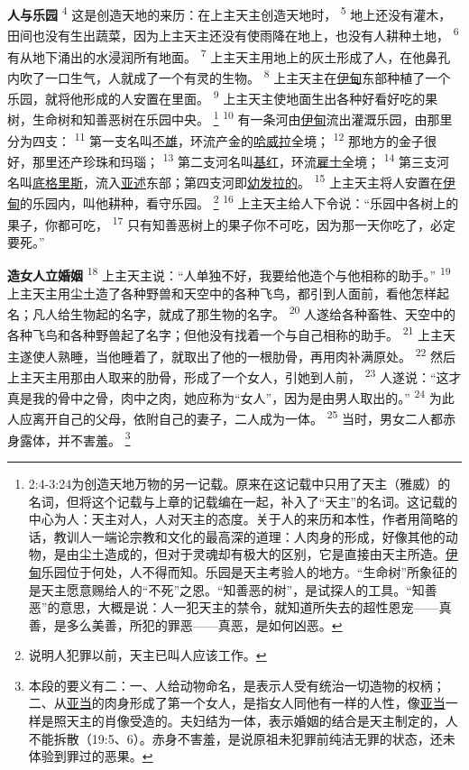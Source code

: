 \textbf{人与乐园 }
\textsuperscript{4}
这是创造天地的来历：在上主天主创造天地时，
\textsuperscript{5}
地上还没有灌木，田间也没有生出蔬菜，因为上主天主还没有使雨降在地上，也没有人耕种土地，
\textsuperscript{6}
有从地下涌出的水浸润所有地面。
\textsuperscript{7}
上主天主用地上的灰土形成了人，在他鼻孔内吹了一口生气，人就成了一个有灵的生物。
\textsuperscript{8}
上主天主在\uline{伊甸}东部种植了一个乐园，就将他形成的人安置在里面。
\textsuperscript{9}
上主天主使地面生出各种好看好吃的果树，生命树和知善恶树在乐园中央。
\footnote{2:4-3:24为创造天地万物的另一记载。原来在这记载中只用了天主（雅威）的名词，但将这个记载与上章的记载编在一起，补入了“天主”的名词。这记载的中心为人：天主对人，人对天主的态度。关于人的来历和本性，作者用简略的话，教训人一端论宗教和文化的最高深的道理：人肉身的形成，好像其他的动物，是由尘土造成的，但对于灵魂却有极大的区别，它是直接由天主所造。\uline{伊甸}乐园位于何处，人不得而知。乐园是天主考验人的地方。“生命树”所象征的是天主愿意赐给人的“不死”之恩。“知善恶的树”，是试探人的工具。“知善恶”的意思，大概是说：人一犯天主的禁令，就知道所失去的超性恩宠——真善，是多么美善，所犯的罪恶——真恶，是如何凶恶。}
\textsuperscript{10}
有一条河由\uline{伊甸}流出灌溉乐园，由那里分为四支：
\textsuperscript{11}
第一支名叫\uline{丕雄}，环流产金的\uline{哈威拉}全境；
\textsuperscript{12}
那地方的金子很好，那里还产珍珠和玛瑙；
\textsuperscript{13}
第二支河名叫\uline{基红}，环流\uline{雇士}全境；
\textsuperscript{14}
第三支河名叫\uline{底格里斯}，流入\uline{亚述}东部；第四支河即\uline{幼发拉的}。
\textsuperscript{15}
上主天主将人安置在\uline{伊甸}的乐园内，叫他耕种，看守乐园。
\footnote{说明人犯罪以前，天主已叫人应该工作。}
\textsuperscript{16}
上主天主给人下令说：“乐园中各树上的果子，你都可吃，
\textsuperscript{17}
只有知善恶树上的果子你不可吃，因为那一天你吃了，必定要死。”

\textbf{造女人立婚姻 }
\textsuperscript{18}
上主天主说：“人单独不好，我要给他造个与他相称的助手。”
\textsuperscript{19}
上主天主用尘土造了各种野兽和天空中的各种飞鸟，都引到人面前，看他怎样起名；凡人给生物起的名字，就成了那生物的名字。
\textsuperscript{20}
人遂给各种畜牲、天空中的各种飞鸟和各种野兽起了名字；但他没有找着一个与自己相称的助手。
\textsuperscript{21}
上主天主遂使人熟睡，当他睡着了，就取出了他的一根肋骨，再用肉补满原处。
\textsuperscript{22}
然后上主天主用那由人取来的肋骨，形成了一个女人，引她到人前，
\textsuperscript{23}
人遂说：“这才真是我的骨中之骨，肉中之肉，她应称为“女人”，因为是由男人取出的。”
\textsuperscript{24}
为此人应离开自己的父母，依附自己的妻子，二人成为一体。
\textsuperscript{25}
当时，男女二人都赤身露体，并不害羞。
\footnote{本段的要义有二：一、人给动物命名，是表示人受有统治一切造物的权柄；二、从\uline{亚当}的肉身形成了第一个女人，是指女人同他有一样的人性，像\uline{亚当}一样是照天主的肖像受造的。夫妇结为一体，表示婚姻的结合是天主制定的，人不能拆散（19:5、6）。赤身不害羞，是说原祖未犯罪前纯洁无罪的状态，还未体验到罪过的恶果。}

